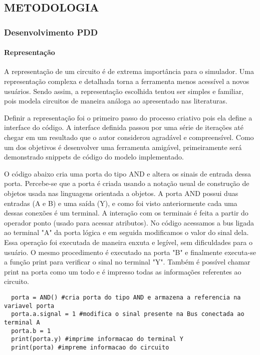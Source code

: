 \subsection{METODOLOGIA}
\subsubsection{Desenvolvimento PDD}
\paragraph{Representação}
A representação de um circuito é de extrema importância para o simulador.
Uma representação complexa e detalhada torna a ferramenta menos acessível a novos usuários.
Sendo assim, a representação escolhida tentou ser simples e familiar, pois modela circuitos de maneira análoga ao apresentado nas literaturas.

Definir a representação foi o primeiro passo do processo criativo pois ela define a interface do código.
A interface definida passou por uma série de iterações até chegar em um resultado que o autor considerou agradável e compreensível.
Como um dos objetivos é desenvolver uma ferramenta amigável, primeiramente será demonstrado snippets de código do modelo implementado.

O código abaixo cria uma porta do tipo AND e altera os sinais de entrada dessa porta.
Percebe-se que a porta é criada usando a notação usual de construção de objetos usada nas linguagens orientada a objetos.
A porta AND possui duas entradas (A e B) e uma saída (Y), e como foi visto anteriormente cada uma dessas conexões é um terminal.
A interação com os terminais é feita a partir do operador ponto (usado para acessar atributos).
No código acessamos a bus ligada ao terminal "A" da porta lógica e em seguida modificamos o valor do sinal dela.
Essa operação foi executada de maneira enxuta e legível, sem dificuldades para o usuário.
O mesmo procedimento é executado na porta "B" e finalmente executa-se a função print para verificar o sinal no terminal "Y".
Também é possível chamar print na porta como um todo e é impresso todas as informações referentes ao circuito.

\begin{lstlisting}
  porta = AND() #cria porta do tipo AND e armazena a referencia na variavel porta
  porta.a.signal = 1 #modifica o sinal presente na Bus conectada ao terminal A
  porta.b = 1
  print(porta.y) #imprime informacao do terminal Y
  print(porta) #impreme informacao do circuito
\end{lstlisting}

